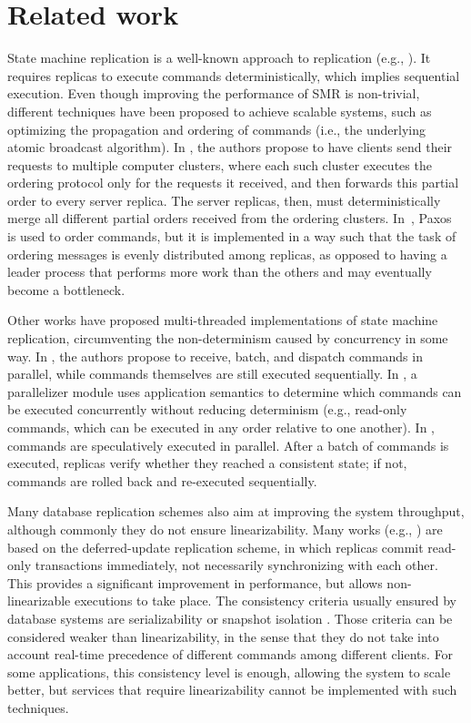 \section{Related work}
\label{sec:rw}

State machine replication is a well-known approach to replication (e.g., \cite{Kapritsos:2012um, kotla2004htbft, Lam78, santos2013htsmr, Sch90}).
It requires replicas to execute commands deterministically, which implies sequential execution.
Even though improving the performance of SMR is non-trivial, different techniques have been proposed to achieve scalable systems, such as optimizing the propagation and ordering of commands (i.e., the underlying atomic broadcast algorithm).
In \cite{kapritsos2010scalable}, the authors propose to have clients send their requests to multiple computer clusters, where each such cluster executes the ordering protocol only for the requests it received, and then forwards this partial order to every server replica.
The server replicas, then, must deterministically merge all different partial orders received from the ordering clusters.
In~\cite{biely2012spaxos}, Paxos~\cite{Lamport:1998ea} is used to order commands, but it is implemented in a way such that the task of ordering messages is evenly distributed among replicas, as opposed to having a leader process that performs more work than the others and may eventually become a bottleneck. 

Other works have proposed multi-threaded implementations of state machine replication, circumventing the non-determinism caused by concurrency in some way. 
In \cite{santos2013htsmr}, the authors propose to receive, batch, and dispatch commands in parallel, while commands themselves are still executed sequentially.
In \cite{kotla2004htbft}, a parallelizer module uses application semantics to determine which commands can be executed concurrently without reducing determinism (e.g., read-only commands, which can be executed in any order relative to one another).
In \cite{kapritsos2012eve}, commands are speculatively executed in parallel.
After a batch of commands is executed, replicas verify whether they reached a consistent state; if not, commands are rolled back and re-executed sequentially. 

Many database replication schemes also aim at improving the system throughput, although commonly they do not ensure linearizability. Many works (e.g., \cite{chundi96dur, kobus2013hybrid, sciascia2012sdur, SousaOMP01}) are based on the deferred-update replication scheme, in which replicas commit read-only transactions immediately, not necessarily synchronizing with each other. This provides a significant improvement in performance, but allows non-linearizable executions to take place. The consistency criteria usually ensured by database systems are serializability \cite{BHG87} or snapshot isolation \cite{LinKJPA09}. Those criteria can be considered weaker than linearizability, in the sense that they do not take into account real-time precedence of different commands among different clients. 
For some applications, this consistency level is enough, allowing the system to scale better, but services that require linearizability cannot be implemented with such techniques.

